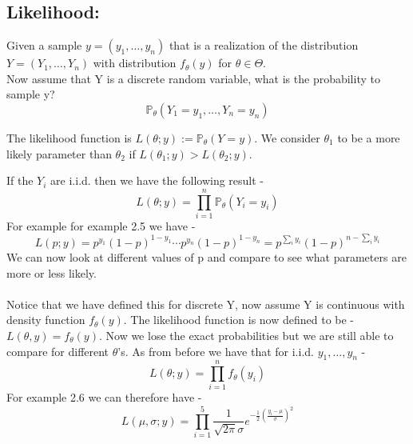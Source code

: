 \documentclass[../main.tex]{subfiles}
\begin{document}
\subsection{Likelihood:} Given a sample $y=(y_1,\dots,y_n)$ that is a realization of the distribution $Y=(Y_1,\dots,Y_n)$ with distribution $f_\theta(y)$ for $\theta\in\Theta$. \\
Now assume that Y is a discrete random variable, what is the probability to sample y?
\[
    \mathbb{P}_{\theta}(Y_1=y_1,\dots,Y_n=y_n)
\]
\begin{definition} The likelihood function is $L(\theta;y):=\mathbb{P}_\theta(Y=y)$. We consider $\theta_1$ to be a more likely parameter than $\theta_2$ if $L(\theta_1;y)>L(\theta_2;y)$.\end{definition}
If the $Y_i$ are i.i.d. then we have the following result - 
\[
    L(\theta;y) = \prod _{i=1}^n \mathbb{P}_\theta(Y_i=y_i)
\]
For example for example 2.5 we have - 
\[
    L(p;y)=p^{y_1}(1-p)^{1-y_1}\cdots p^{y_n}(1-p)^{1-y_n} = p^{\sum_i y_i}(1-p)^{n-\sum_i y_i}
\]
We can now look at different values of p and compare to see what parameters are more or less likely.
\\\\
Notice that we have defined this for discrete Y, now assume Y is continuous with density function $f_\theta(y)$. The likelihood function is now defined to be - $L(\theta,y)=f_\theta(y)$. Now we lose the exact probabilities but we are still able to compare for different $\theta$'s. As from before we have that for i.i.d. $y_1,\dots,y_n$ - 
\[
    L(\theta;y)=\prod_{i=1}^n f_\theta(y_i)
\]
For example 2.6 we can therefore have - 
\[
    L(\mu,\sigma;y)=\prod_{i=1}^5 \frac{1}{\sqrt{2\pi}\sigma}e^{-\frac{1}{2}(\frac{y_i-\mu}{\sigma})^2}
\]
\end{document}
